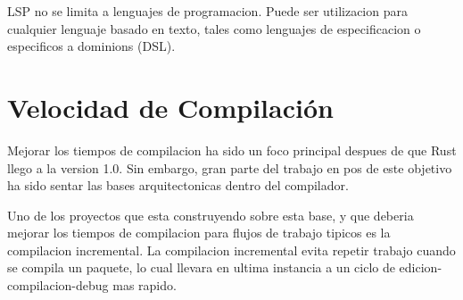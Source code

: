 \documentclass[12pt, a4paper]{report}
\begin{document}
    LSP no se limita a lenguajes de programacion.
    Puede ser utilizacion para cualquier lenguaje basado en texto, tales como lenguajes de especificacion o especificos a dominions (DSL).
    \cite{language_server_protocol_wiki}

  \section*{Velocidad de Compilación}

    Mejorar los tiempos de compilacion ha sido un foco principal despues de que Rust llego a la version 1.0.
    Sin embargo, gran parte del trabajo en pos de este objetivo ha sido sentar las bases arquitectonicas dentro del compilador.

    Uno de los proyectos que esta construyendo sobre esta base, y que deberia mejorar los tiempos de compilacion para flujos de trabajo tipicos es la compilacion incremental.
    La compilacion incremental evita repetir trabajo cuando se compila un paquete, lo cual llevara en ultima instancia a un ciclo de edicion-compilacion-debug mas rapido.
    \cite{rust_blog_incremental_compilation}

\end{document}
